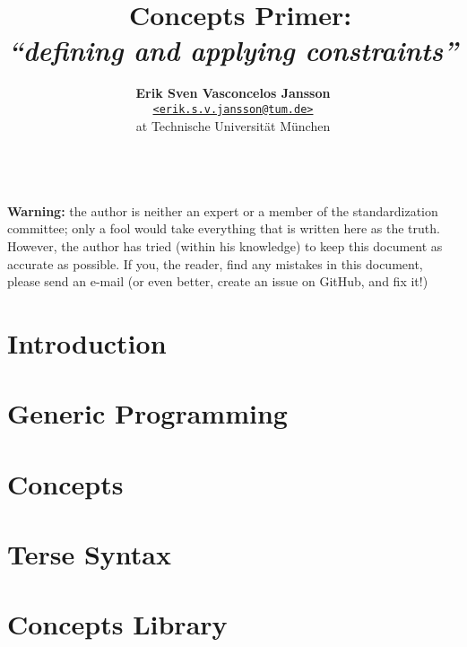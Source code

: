 \documentclass[a4paper, 11pt]{article}
\title{\vspace{-1.5em}\textbf{\Cpp\ Concepts Primer:}\\
       \large{\emph{``defining and applying constraints''}}}
\author{{\textbf{Erik Sven Vasconcelos Jansson}} \\
        {\href{mailto:erik.s.v.jansson@tum.de}
        {\texttt{<erik.s.v.jansson@tum.de>}}} \\
        {at Technische Universität München}}
\begin{document}
    \maketitle \begin{abstract}
    \end{abstract} \tableofcontents

    \mbox{} \\ \noindent \textbf{Warning:} the author is neither an expert or a member of the standardization committee; only a fool would take everything that is written here as the truth. However, the author has tried (within his knowledge) to keep this document as accurate as possible. If you, the reader, find any mistakes in this document, please send an e-mail (or even better, create an issue on GitHub, and fix it!) \mbox{}  \thispagestyle{empty} \newpage {}

    \section{Introduction} \label{sec:introduction} 

    \newpage

    \section{Generic Programming} \label{sec:generic_programming} 

    \newpage

    \section{Concepts} \label{sec:concepts} 

    \newpage

    \section{Terse Syntax} \label{sec:terse_syntax} 

    \newpage

    \section{Concepts Library} \label{sec:concepts_library} 

    \newpage
    \nocite{*} %
    
    
    \newpage \appendix
\end{document}

